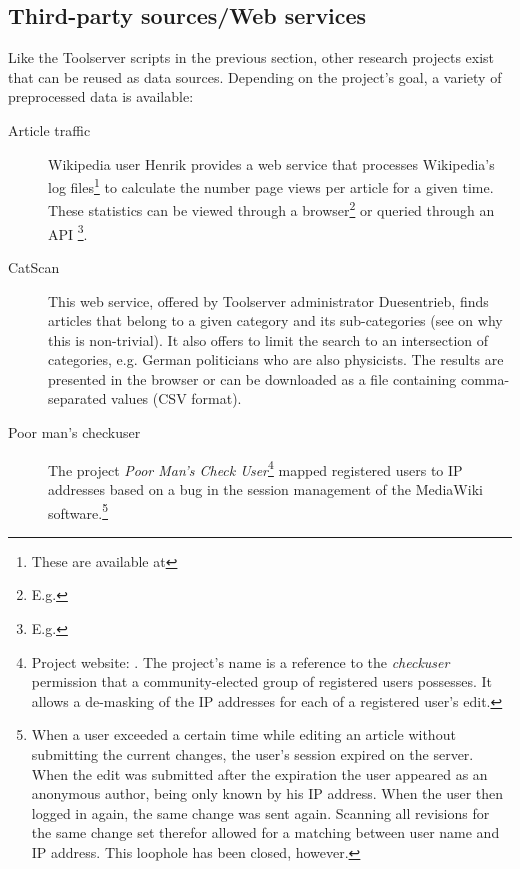 \subsection{Third-party sources/Web services}\label{sub:webservices}

Like the Toolserver scripts in the previous section, other research projects exist that can be reused as data sources.
Depending on the project's goal, a variety of preprocessed data is available:

\begin{description}
\item[Article traffic] Wikipedia user Henrik provides a web service that processes Wikipedia's log files\footnote{These are available at } to calculate the number page views per article for a given time.
These statistics can be viewed through a browser\footnote{E.g. } or queried through an API \footnote{E.g. }. 
\item[CatScan] This web service, offered by Toolserver administrator Duesentrieb, finds articles that belong to a given category and its sub-categories (see  on why this is non-trivial).
It also offers to limit the search to an intersection of categories, e.g. German politicians who are also physicists.
The results are presented in the browser or can be downloaded as a file containing comma-separated values (CSV format). 
\item[Poor man's checkuser] The project \emph{Poor Man's Check User}\footnote{Project website: . The project's name is a reference to the \emph{checkuser} permission that a community-elected group of registered users possesses. It allows a de-masking of the IP addresses for each of a registered user's edit.} mapped registered users to IP addresses based on a bug in the session management of the MediaWiki software.\footnote{When a user exceeded a certain time while editing an article without submitting the current changes, the user's session expired on the server. When the edit was submitted after the expiration the user appeared as an anonymous author, being only known by his IP address. When the user then logged in again, the same change was sent again. Scanning all revisions for the same change set therefor allowed for a matching between user name and IP address. This loophole has been closed, however.} 

\end{description}
